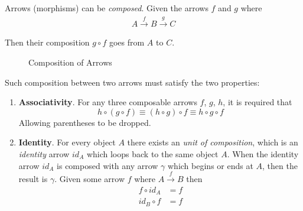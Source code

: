 \begin{definition}
    Arrows (morphisms) can be \textit{composed}. Given the arrows $f$ and $g$ where
    \begin{equation}
        \begin{aligned}
            A \xrightarrow{f} B \xrightarrow{g} C
        \end{aligned}
    \end{equation}
    
    Then their composition $g \circ f$ goes from $A$ to $C$.
    
    \begin{figure}[H]
        \centering
        \caption{Composition of Arrows}
        \label{fig:arrow-composition}
    \end{figure}
    
    Such composition between two arrows must satisfy the two properties:
    \begin{enumerate}
        \item \textbf{Associativity}.
        For any three composable arrows $f$, $g$, $h$, it is required that
        \begin{equation}
            h \circ (g \circ f) \equiv (h \circ g) \circ f \equiv h \circ g \circ f
        \end{equation}
        Allowing parentheses to be dropped.
        \item \textbf{Identity}. For every object $A$ there exists an \textit{unit of composition}, which is an \textit{identity} arrow $id_A$ which loops back to the same object $A$. When the identity arrow $id_A$ is composed with any arrow $\gamma$ which begins or ends at $A$, then the result is $\gamma$. Given some arrow $f$ where $A \xrightarrow{f} B$ then
        \begin{align}
            f \circ id_A &= f \\
            id_B \circ f &= f
        \end{align}
    \end{enumerate}
    

\end{definition}
